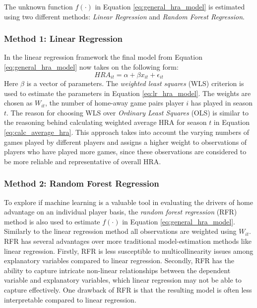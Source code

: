 \noindent
The unknown function $f(\cdot)$ in Equation \ref{eq:general_hra_model} is estimated using two different methods: \textit{Linear Regression} and \textit{Random Forest Regression}.

\subsubsection{Method 1: Linear Regression}
In the linear regression framework the final model from Equation \ref{eq:general_hra_model} now takes on the following form:
\begin{equation}
    \label{eq:lr_hra_model}
    HRA_{it} = \alpha + \beta x_{it} + \epsilon_{it}
\end{equation}
Here $\beta$ is a vector of parameters. The \textit{weighted least squares} (WLS) criterion is used to estimate the parameters in Equation \ref{eq:lr_hra_model}. The weights are chosen as $W_{it}$, the number of home-away game pairs player $i$ has played in season $t$. The reason for choosing WLS over \textit{Ordinary Least Squares} (OLS) is similar to the reasoning behind calculating weighted average HRA for season $t$ in Equation \ref{eq:calc_average_hra}. This approach takes into account the varying numbers of games played by different players and assigns a higher weight to observations of players who have played more games, since these observations are considered to be more reliable and representative of overall HRA.

\subsubsection{Method 2: Random Forest Regression}
To explore if machine learning is a valuable tool in evaluating the drivers of home advantage on an individual player basis, the \textit{random forest regression} (RFR) method is also used to estimate $f(\cdot)$ in Equation \ref{eq:general_hra_model}. Similarly to the linear regression method all observations are weighted using $W_{it}$. \\

\noindent
RFR has several advantages over more traditional model-estimation methods like linear regression. Firstly, RFR is less susceptible to multicollinearity issues among explanatory variables compared to linear regression. Secondly, RFR has the ability to capture intricate non-linear relationships between the dependent variable and explanatory variables, which linear regression may not be able to capture effectively. One drawback of RFR is that the resulting model is often less interpretable compared to linear regression. \\

